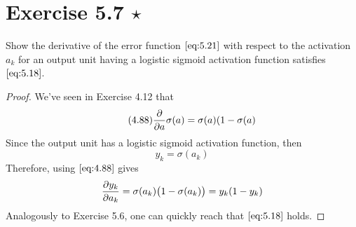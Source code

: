 \section*{Exercise 5.7 $\star$}
Show the derivative of the error function $\eqref{eq:5.21}$ with respect
to the activation $a_k$ for an output unit having a logistic sigmoid activation
function satisfies $\eqref{eq:5.18}$.

\vspace{1em}

\begin{proof}
    We've seen in Exercise 4.12 that
    \begin{equation}\tag{4.88}
        \pdv{a} \sigma(a) = \sigma(a)(1 - \sigma(a)
    \end{equation}
    Since the output unit has a logistic sigmoid activation function, then
    \[
        y_k = \sigma(a_k)
    \] 
    Therefore, using $\eqref{eq:4.88}$ gives
     \[
         \pdv{y_k}{a_k} = \sigma(a_k)\big(1 - \sigma(a_k)\big) = y_k(1 - y_k)
    \] 
    Analogously to Exercise 5.6, one can quickly reach that $\eqref{eq:5.18}$ holds.
\end{proof}
